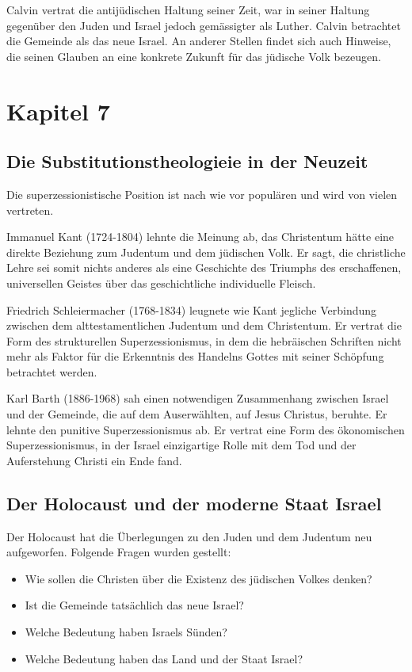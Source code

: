 \documentclass[fontsize=14pt]{../../inc/mybib}
\newcommand{\sz}{Superzessionismus}
\newcommand{\sts}{Substitutionstheologie}
\begin{document}
    Calvin vertrat die antijüdischen Haltung seiner Zeit, war in seiner Haltung gegenüber den Juden und Israel jedoch gemässigter als Luther. Calvin betrachtet die Gemeinde als das neue Israel. An anderer Stellen findet sich auch Hinweise, die seinen Glauben an eine konkrete Zukunft für das jüdische Volk bezeugen.
    \section{Kapitel 7}
    \subsection{Die \sts ie in der Neuzeit}
    Die superzessionistische Position ist nach wie vor populären und wird von vielen vertreten.

    Immanuel Kant (1724-1804) lehnte die Meinung ab, das Christentum hätte eine direkte Beziehung zum Judentum und dem jüdischen Volk. Er sagt, die christliche Lehre sei somit nichts anderes als eine Geschichte des Triumphs des erschaffenen, universellen Geistes über das geschichtliche individuelle Fleisch.

    Friedrich Schleiermacher (1768-1834) leugnete wie Kant jegliche Verbindung zwischen dem alttestamentlichen Judentum und dem Christentum. Er vertrat die Form des strukturellen \sz, in dem die hebräischen Schriften nicht mehr als Faktor für die Erkenntnis des Handelns Gottes mit seiner Schöpfung betrachtet werden.

    Karl Barth (1886-1968) sah einen notwendigen Zusammenhang zwischen Israel und der Gemeinde, die auf dem Auserwählten, auf Jesus Christus, beruhte. Er lehnte den punitive \sz{} ab. Er vertrat eine Form des ökonomischen \sz, in der Israel einzigartige Rolle mit dem Tod und der Auferstehung Christi ein Ende fand.

    \subsection{Der Holocaust und der moderne Staat Israel}
    Der Holocaust hat die Überlegungen zu den Juden und dem Judentum neu aufgeworfen. Folgende Fragen wurden gestellt:
    \begin{itemize}
        \item Wie sollen die Christen über die Existenz des jüdischen Volkes denken?
        \item Ist die Gemeinde tatsächlich das neue Israel?
        \item Welche Bedeutung haben Israels Sünden?
        \item Welche Bedeutung haben das Land und der Staat Israel?
    \end{itemize}
\end{document}
